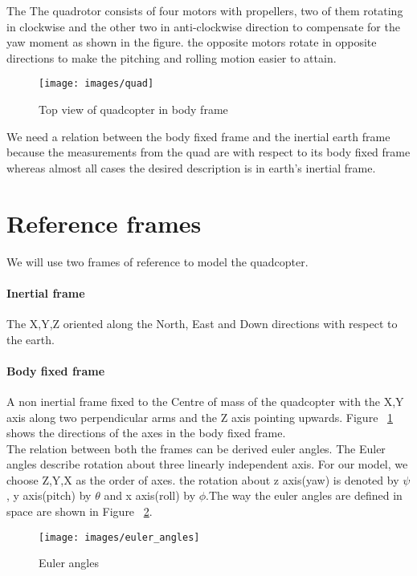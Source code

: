 The The quadrotor consists of four motors with propellers, two of them rotating in clockwise and the other two in anti-clockwise direction to compensate for the yaw moment as shown in the figure. the opposite motors rotate in opposite directions to make the pitching and rolling motion easier to attain.
\begin{figure}[H]
  \centering
  \texttt{[image: images/quad]}
  \caption{Top view of quadcopter in body frame}
  \label{fig:quadrotor}
\end{figure}
We need a relation between the body fixed frame and the inertial earth frame because the measurements from the quad are with respect to its body fixed frame whereas almost all cases the desired description is in earth's inertial frame.
\newpage
  \section{Reference frames}
    We will use two frames of reference to model the quadcopter.
\paragraph{Inertial frame}
  The X,Y,Z oriented along the North, East and Down directions with respect to the earth.
\paragraph{Body fixed frame}
  A non inertial frame fixed to the Centre of mass of the quadcopter with the X,Y axis along two perpendicular arms and the Z axis pointing upwards. Figure ~\ref{fig:quadrotor} shows the directions of the axes in the body fixed frame. \\

The relation between both the frames can be derived euler angles. The Euler angles describe rotation about three linearly independent axis. For our model, we choose Z,Y,X as the order of axes. the rotation about z axis(yaw) is denoted by $\psi$, y axis(pitch) by $\theta$ and x axis(roll) by $\phi$.The way the euler angles are defined in space are shown in Figure ~\ref{fig:euler}.\\

\begin{figure}[H]
  \centering
  \texttt{[image: images/euler\_angles]}
  \caption{Euler angles}
  \label{fig:euler}
\end{figure}

